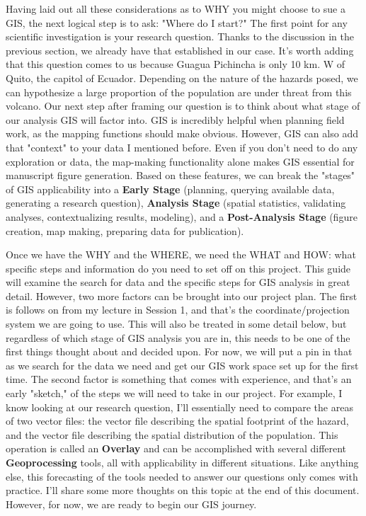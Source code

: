 \documentclass{article}
\begin{document}
Having laid out all these considerations as to WHY you might choose to sue a GIS, the next logical step is to ask: "Where do I start?" The first point for any scientific investigation is your research question. Thanks to the discussion in the previous section, we already have that established in our case. It's worth adding that this question comes to us because Guagua Pichincha is only 10 km. W of Quito, the capitol of Ecuador. Depending on the nature of the hazards posed, we can hypothesize a large proportion of the population are under threat from this volcano. Our next step after framing our question is to think about what stage of our analysis GIS will factor into. GIS is incredibly helpful when planning field work, as the mapping functions should make obvious. However, GIS can also add that "context" to your data I mentioned before. Even if you don't need to do any exploration or data, the map-making functionality alone makes GIS essential for manuscript figure generation. Based on these features, we can break the "stages" of GIS applicability into a \textbf{Early Stage} (planning, querying available data, generating a research question), \textbf{Analysis Stage} (spatial statistics, validating analyses, contextualizing results, modeling), and a \textbf{Post-Analysis Stage} (figure creation, map making, preparing data for publication).  

Once we have the WHY and the WHERE, we need the WHAT and HOW: what specific steps and information do you need to set off on this project. This guide will examine the search for data and the specific steps for GIS analysis in great detail. However, two more factors can be brought into our project plan. The first is follows on from my lecture in Session 1, and that's the coordinate/projection system we are going to use. This will also be treated in some detail below, but regardless of which stage of GIS analysis you are in, this needs to be one of the first things thought about and decided upon. For now, we will put a pin in that as we search for the data we need and get our GIS work space set up for the first time. The second factor is something that comes with experience, and that's an early "sketch," of the steps we will need to take in our project. For example, I know looking at our research question, I'll essentially need to compare the areas of two vector files: the vector file describing the spatial footprint of the hazard, and the vector file describing the spatial distribution of the population. This operation is called an \textbf{Overlay} and can be accomplished with several different \textbf{Geoprocessing} tools, all with applicability in different situations. Like anything else, this forecasting of the tools needed to answer our questions only comes with practice. I'll share some more thoughts on this topic at the end of this document. However, for now, we are ready to begin our GIS journey. 
\end{document}
